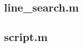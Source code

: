 \documentclass[12pt, a4paper]{article}
\begin{document}
\pagebreak

\subsection*{line\_search.m}


\pagebreak

\subsection*{script.m}

\end{document}

